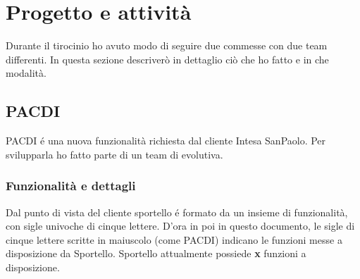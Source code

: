 \section{Progetto e attività}

Durante il tirocinio ho avuto modo di seguire due commesse con due team differenti. In questa sezione descriverò in dettaglio ciò che ho fatto e in che modalità.

\subsection{PACDI}

PACDI é una nuova funzionalità richiesta dal cliente Intesa SanPaolo. Per svilupparla ho fatto parte di un team di evolutiva. 

\subsubsection{Funzionalità e dettagli}
Dal punto di vista del cliente sportello é formato da un insieme di funzionalità, con sigle univoche di cinque lettere. D'ora in poi in questo documento, le sigle di cinque lettere scritte in maiuscolo (come PACDI) indicano le funzioni messe a disposizione da Sportello. 
Sportello attualmente possiede \textbf{x} funzioni a disposizione. \\
 
